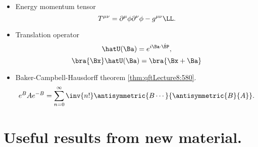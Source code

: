 \begin{itemize}
\item Energy momentum tensor
\begin{equation}\label{eqn:usefulFormulas:500}
T^{\mu\nu} = \partial^\mu \phi \partial^\nu \phi - g^{\mu\nu} \LL.
\end{equation}
\item Translation operator
\begin{equation}\label{eqn:usefulFormulas:520}
\hatU(\Ba) = e^{i \Ba \cdot \hat{\BP}},
\end{equation}
\begin{equation}\label{eqn:usefulFormulas:540}
\bra{\Bx} \hatU(\Ba) = \bra{\Bx + \Ba}
\end{equation}
\item Baker-Campbell-Hausdorff theorem \cref{thm:qftLecture8:580}.
\begin{equation}\label{eqn:usefulFormulas:560}
e^{B} A e^{-B} = \sum_{n = 0}^\infty \inv{n!} \antisymmetric{B \cdots}{\antisymmetric{B}{A}}.
\end{equation}
\end{itemize}

\section{Useful results from new material.}

